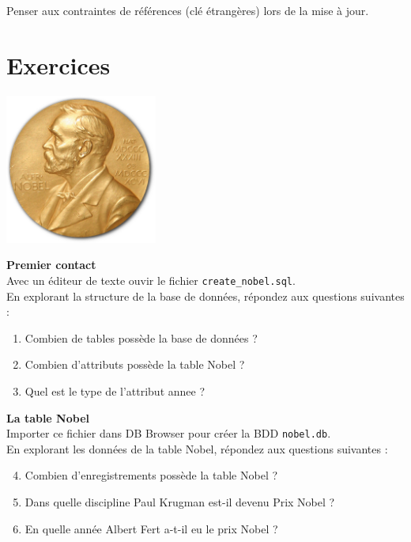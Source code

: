 Penser aux contraintes de références (clé étrangères) lors de la mise à jour.
\section{Exercices}

\begin{exercice}
    \begin{center}
        \includegraphics[width=5cm]{img/nobel}
    \end{center}
    \textbf{Premier contact}\\
    
    Avec un éditeur de texte ouvir le fichier \texttt{create\_nobel.sql}.\\
    En explorant la structure de la base de données, répondez aux questions suivantes :	\\
    \begin{enumerate}
        \item 	Combien de tables possède la base de données ?
        \item 	Combien d'attributs possède la table Nobel ?
        \item 	Quel est le type de l'attribut annee ?\\
    \end{enumerate}
    \textbf{La table Nobel}\\
    
    Importer ce fichier dans DB Browser pour créer la BDD \texttt{nobel.db}.\\
    En explorant les données de la table Nobel, répondez aux questions suivantes :\\
    
    \begin{enumerate}
        \setcounter{enumi}{3}
        \item 	Combien d'enregistrements possède la table Nobel ?
        \item 	Dans quelle discipline Paul Krugman est-il devenu Prix Nobel ?
        \item 	En quelle année Albert Fert a-t-il eu le prix Nobel ?	\\
    \end{enumerate}
    

\end{exercice}
